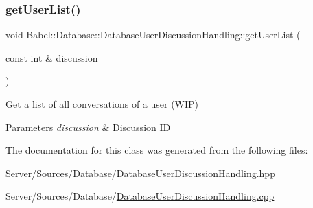 \subsubsection{\texorpdfstring{get\+User\+List()}{getUserList()}}
{\footnotesize\ttfamily void Babel\+::\+Database\+::\+Database\+User\+Discussion\+Handling\+::get\+User\+List (\begin{DoxyParamCaption}\item[{const int \&}]{discussion }\end{DoxyParamCaption})}

Get a list of all conversations of a user (W\+IP) 
\begin{DoxyParams}{Parameters}
{\em discussion} & Discussion ID \\
\hline
\end{DoxyParams}


The documentation for this class was generated from the following files\+:\begin{DoxyCompactItemize}
\item 
Server/\+Sources/\+Database/\hyperlink{DatabaseUserDiscussionHandling_8hpp}{Database\+User\+Discussion\+Handling.\+hpp}\item 
Server/\+Sources/\+Database/\hyperlink{DatabaseUserDiscussionHandling_8cpp}{Database\+User\+Discussion\+Handling.\+cpp}\end{DoxyCompactItemize}
